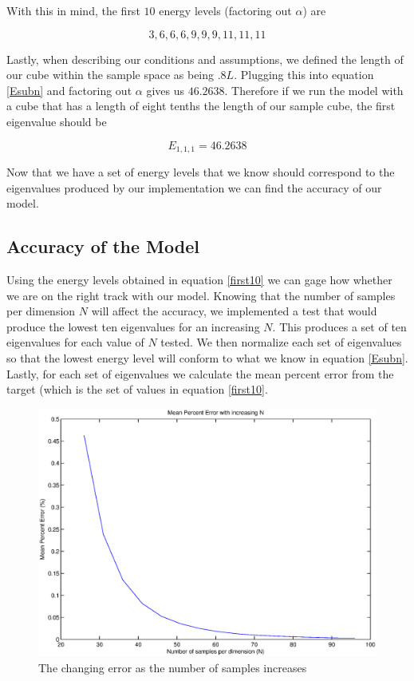 \documentclass[authoryearcitations]{UoYCSproject}
\begin{document}
With this in mind, the first $10$ energy levels (factoring out $\alpha$) are

\begin{equation}
3, 6, 6, 6, 9, 9, 9, 11, 11, 11
\label{first10}
\end{equation}

Lastly, when describing our conditions and assumptions, we defined the length of our cube within the sample
space as being $.8L$. Plugging this into equation \ref{Esubn} and factoring out $\alpha$ gives us $46.2638$. 
Therefore if we run the model with a cube that has a length of eight tenths the length of our sample cube, 
the first eigenvalue should be 

\begin{equation}
E_{1,1,1} = 46.2638 
\label{lowestVal}
\end{equation}

Now that we have a set of energy levels that we know should correspond to the eigenvalues produced by our implementation
we can find the accuracy of our model. 

\subsection{Accuracy of the Model}
Using the energy levels obtained in equation \ref{first10} we can gage how whether we are on the right track with our model.
Knowing that the number of samples per dimension $N$ will affect the accuracy, we implemented a test that would produce
the lowest ten eigenvalues for an increasing $N$. This produces a set of ten eigenvalues for each value of $N$ tested. 
We then normalize each set of eigenvalues so that the lowest energy level will
conform to what we know in equation \ref{Esubn}. Lastly, for each set of eigenvalues we calculate the mean percent error
from the target (which is the set of values in equation \ref{first10}.

\begin{figure}
\centering
\includegraphics[scale=0.5]{figures/meanPercentError.eps}
\caption{The changing error as the number of samples increases}
\label{errorPlot}
\end{figure}
\end{document}
